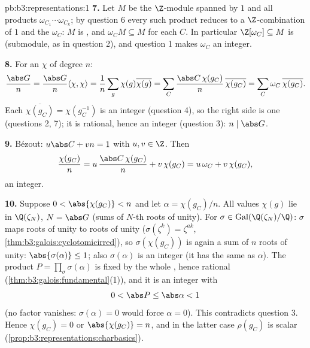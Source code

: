 \begin{solution}{pb:b3:representations:1}
\textbf{7.} Let $M$ be the $\Z$-module spanned by $1$ and all
products $\omega_{C_1}\cdots\omega_{C_k}$; by question 6 every
such product reduces to a $\Z$-combination of $1$ and the
$\omega_C$: $M$ is , and $\omega_C M
\subseteq M$ for each $C$. In particular $\Z[\omega_C]
\subseteq M$ is  (submodule, as in question
2), and question 1 makes $\omega_C$ an  integer.

\textbf{8.} For an  $\chi$ of degree $n$:
\[
\frac{\abs G}{n} = \frac{\abs G}{n}\langle\chi,\chi\rangle
= \frac1n \sum_{g}\chi(g)\overline{\chi(g)}
= \sum_{C}\frac{\abs C\,\chi(g_C)}{n}\,\overline{\chi(g_C)}
= \sum_C \omega_C\,\overline{\chi(g_C)} .
\]
Each $\overline{\chi(g_C)} = \chi(g_C^{-1})$ is an 
integer (question 4), so the right side is one (questions 2,
7); it is rational, hence an integer (question 3): $n \mid \abs
G$.

\textbf{9.} B\'ezout: $u\abs C + vn = 1$ with $u, v \in \Z$.
Then
\[
\frac{\chi(g_C)}{n} = u\,\frac{\abs C\,\chi(g_C)}{n} +
v\,\chi(g_C) = u\,\omega_C + v\,\chi(g_C),
\]
an  integer.

\textbf{10.} Suppose $0 < \abs{\chi(g_C)} < n$ and let $\alpha
= \chi(g_C)/n$. All values $\chi(g)$ lie in $\Q(\zeta_N)$, $N =
\abs G$ (sums of $N$-th roots of unity). For $\sigma \in
\operatorname{Gal}(\Q(\zeta_N)/\Q)$: $\sigma$ maps roots of
unity to roots of unity ($\sigma(\zeta^k) = \zeta^{ak}$,
\cref{thm:b3:galois:cyclotomicirred}), so $\sigma(\chi(g_C))$
is again a sum of $n$ roots of unity: $\abs{\sigma(\alpha)}
\leq 1$; also $\sigma(\alpha)$ is an  integer (it has
the same  as $\alpha$). The product $P =
\prod_\sigma \sigma(\alpha)$ is fixed by the whole , hence rational (\cref{thm:b3:galois:fundamental}(1)),
and it is an  integer with
\[
0 < \abs P \leq \abs\alpha < 1
\]
(no factor vanishes: $\sigma(\alpha) = 0$ would force $\alpha =
0$). This contradicts question 3. Hence $\chi(g_C) = 0$ or
$\abs{\chi(g_C)} = n$, and in the latter case $\rho(g_C)$ is
scalar (\cref{prop:b3:representations:charbasics}).


\end{solution}
